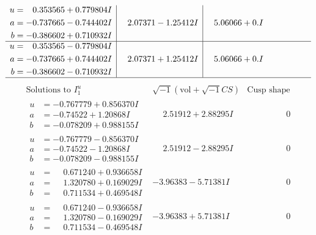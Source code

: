 \documentclass[1p]{elsarticle_modified}
\theoremstyle{definition}
\newcommand{\I}{\sqrt{-1}}
\begin{document}
$$\begin{array}{c|c|c}
\begin{aligned}
u &= \phantom{-}0.353565 + 0.779804 I \\
a &= -0.737665 - 0.744402 I \\
b &= -0.386602 + 0.710932 I\end{aligned}
 & \phantom{-}2.07371 - 1.25412 I & \phantom{-}5.06066 + 0. I\phantom{ +0.000000I} \\ \hline\begin{aligned}
u &= \phantom{-}0.353565 - 0.779804 I \\
a &= -0.737665 + 0.744402 I \\
b &= -0.386602 - 0.710932 I\end{aligned}
 & \phantom{-}2.07371 + 1.25412 I & \phantom{-}5.06066 + 0. I\phantom{ +0.000000I}\\
 \hline 
 \end{array}$$\newpage$$\begin{array}{c|c|c}  
\text{Solutions to }I^u_{1}& \I (\text{vol} + \sqrt{-1}CS) & \text{Cusp shape}\\
 \hline 
\begin{aligned}
u &= -0.767779 + 0.856370 I \\
a &= -0.74522 + 1.20868 I \\
b &= -0.078209 + 0.988155 I\end{aligned}
 & \phantom{-}2.51912 + 2.88295 I & \phantom{-0.000000 } 0 \\ \hline\begin{aligned}
u &= -0.767779 - 0.856370 I \\
a &= -0.74522 - 1.20868 I \\
b &= -0.078209 - 0.988155 I\end{aligned}
 & \phantom{-}2.51912 - 2.88295 I & \phantom{-0.000000 } 0 \\ \hline\begin{aligned}
u &= \phantom{-}0.671240 + 0.936658 I \\
a &= \phantom{-}1.320780 + 0.169029 I \\
b &= \phantom{-}0.711534 + 0.469548 I\end{aligned}
 & -3.96383 - 5.71381 I & \phantom{-0.000000 } 0 \\ \hline\begin{aligned}
u &= \phantom{-}0.671240 - 0.936658 I \\
a &= \phantom{-}1.320780 - 0.169029 I \\
b &= \phantom{-}0.711534 - 0.469548 I\end{aligned}
 & -3.96383 + 5.71381 I & \phantom{-0.000000 } 0 \\ \hline\begin{aligned}

\end{aligned}
\end{array}$$
\end{document}
